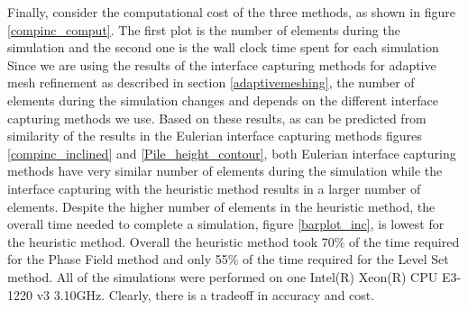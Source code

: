 \documentclass[review]{elsarticle}
\begin{document}
Finally, consider the computational cost of the three methods, as shown in figure \ref{compinc_comput}.
The first plot is the number of elements during the simulation and the second one is the wall clock time spent for each simulation
Since we are using the results of the interface capturing methods for adaptive mesh refinement as described in section \ref{adaptivemeshing}, 
the number of elements during the simulation changes and depends on the different interface capturing methods we use. 
Based on these results, as can be predicted from similarity of the results in the Eulerian interface capturing methods figures \ref{compinc_inclined} 
and \ref{Pile_height_contour}, both Eulerian interface capturing methods have very similar number of elements during the simulation while the 
interface capturing with the heuristic method results in a larger number of elements. 
Despite the higher number of elements in the heuristic method, the overall time needed to complete a simulation, figure \ref{barplot_inc},
is lowest for the heuristic method. Overall the heuristic method took 70\% of the time required for the Phase Field method and only 55\% 
of the time required for the Level Set method.
All of the simulations were performed on one Intel(R) Xeon(R) CPU E3-1220 v3 3.10GHz. Clearly, there is a tradeoff in accuracy and cost.

\end{document}
